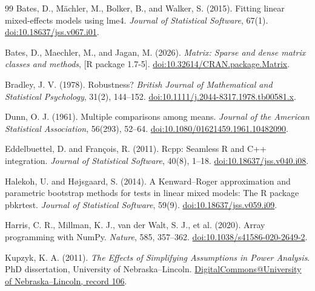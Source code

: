 \begin{thebibliography}{99}
Bates, D., Mächler, M., Bolker, B., and Walker, S. (2015).
Fitting linear mixed-effects models using lme4.
\emph{Journal of Statistical Software}, 67(1).
\href{https://www.jstatsoft.org/article/view/v067i01}{doi:10.18637/jss.v067.i01}.

Bates, D., Maechler, M., and Jagan, M. (2026).
\emph{Matrix: Sparse and dense matrix classes and methods}, [R package 1.7-5].
\href{https://doi.org/10.32614/CRAN.package.Matrix}{doi:10.32614/CRAN.package.Matrix}.

Bradley, J. V. (1978). Robustness?
\emph{British Journal of Mathematical and Statistical Psychology}, 31(2), 144--152.
\href{https://doi.org/10.1111/j.2044-8317.1978.tb00581.x}{doi:10.1111/j.2044-8317.1978.tb00581.x}.

Dunn, O. J. (1961). Multiple comparisons among means.
\emph{Journal of the American Statistical Association}, 56(293), 52--64.
\href{https://doi.org/10.1080/01621459.1961.10482090}{doi:10.1080/01621459.1961.10482090}.

Eddelbuettel, D. and François, R. (2011). Rcpp: Seamless R and C++ integration.
\emph{Journal of Statistical Software}, 40(8), 1--18.
\href{https://doi.org/10.18637/jss.v040.i08}{doi:10.18637/jss.v040.i08}.

Halekoh, U. and Højsgaard, S. (2014).
A Kenward--Roger approximation and parametric bootstrap methods for tests in linear mixed models: The R package pbkrtest.
\emph{Journal of Statistical Software}, 59(9).
\href{https://www.jstatsoft.org/article/view/v059i09}{doi:10.18637/jss.v059.i09}.

Harris, C. R., Millman, K. J., van der Walt, S. J., et al. (2020). Array programming with NumPy.
\emph{Nature}, 585, 357--362.
\href{https://doi.org/10.1038/s41586-020-2649-2}{doi:10.1038/s41586-020-2649-2}.

Kupzyk, K. A. (2011).
\emph{The Effects of Simplifying Assumptions in Power Analysis}.
PhD dissertation, University of Nebraska--Lincoln.
\href{https://digitalcommons.unl.edu/cehsdiss/106/}{DigitalCommons@University of Nebraska--Lincoln, record 106}.


\end{thebibliography}

